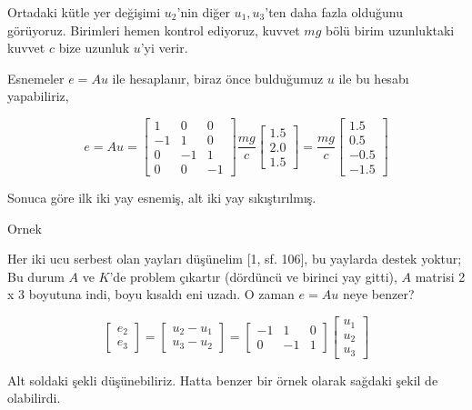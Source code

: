 \documentclass[12pt,fleqn]{article}\usepackage{../../common}
\begin{document}
Ortadaki kütle yer değişimi $u_2$'nin diğer $u_1,u_3$'ten daha fazla olduğunu
görüyoruz. Birimleri hemen kontrol ediyoruz, kuvvet $mg$ bölü birim uzunluktaki
kuvvet $c$ bize uzunluk $u$'yi verir.

Esnemeler $e = A u$ ile hesaplanır, biraz önce bulduğumuz $u$ ile bu hesabı
yapabiliriz,

$$
e = A u = 
\left[\begin{array}{rrr}
1 & 0 & 0 \\ -1 & 1 & 0 \\ 0 & -1 & 1 \\ 0 & 0 & -1
\end{array}\right]
\frac{mg}{c}
\left[\begin{array}{r}
1.5 \\ 2.0 \\ 1.5
\end{array}\right] =
\frac{mg}{c}
\left[\begin{array}{r}
1.5 \\ 0.5 \\ -0.5 \\ -1.5
\end{array}\right]
$$

Sonuca göre ilk iki yay esnemiş, alt iki yay sıkıştırılmış.

Ornek

Her iki ucu serbest olan yayları düşünelim [1, sf. 106], bu yaylarda destek
yoktur; Bu durum $A$ ve $K$'de problem çıkartır (dördüncü ve birinci yay gitti),
$A$ matrisi 2 x 3 boyutuna indi, boyu kısaldı eni uzadı. O zaman $e = Au$ neye
benzer?

$$
\left[\begin{array}{r}
e_2 \\ e_3 
\end{array}\right] =
\left[\begin{array}{r}
u_2 - u_1 \\u_3 - u_2
\end{array}\right] =
\left[\begin{array}{rrr}
-1 & 1 & 0 \\ 0 & -1 & 1
\end{array}\right]
\left[\begin{array}{r}
u_1 \\ u_2 \\ u_3
\end{array}\right] 
$$

Alt soldaki şekli düşünebiliriz. Hatta benzer bir örnek olarak sağdaki şekil de
olabilirdi. 
\end{document}
